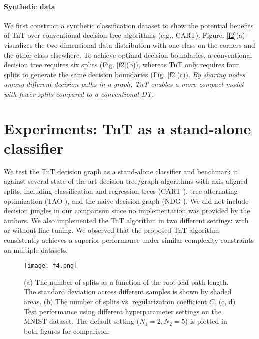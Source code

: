 \documentclass{article}
\begin{document}
\vspace{-2mm}
\paragraph{Synthetic data} We first construct a synthetic classification dataset to show the potential benefits of TnT over conventional decision tree algorithms (e.g., CART). Figure. \ref{f2}(a) visualizes the two-dimensional data distribution with one class on the corners and the other class elsewhere. To achieve optimal decision boundaries, a conventional decision tree requires six splits (Fig. \ref{f2}(b)), whereas TnT only requires four splits to generate the same decision boundaries (Fig. \ref{f2}(c)). \textit{By sharing nodes among different decision paths in a graph, TnT enables a more compact model with fewer splits compared to a conventional DT.}

\vspace{-0mm}
\section{Experiments: TnT as a stand-alone classifier}\vspace{-0mm}
We test the TnT decision graph as a stand-alone classifier and benchmark it against several state-of-the-art decision tree/graph algorithms with axis-aligned splits, including classification and regression trees (CART \cite{steinberg2009cart}), tree alternating optimization (TAO \cite{carreira2018alternating}), and the naive decision graph (NDG \cite{oliver1992decision}). 
We did not include  decision jungles \cite{shotton2013decision} in our comparison since no implementation was provided by the authors. We also implemented the TnT algorithm in two different settings: with or without fine-tuning. We observed that the proposed TnT algorithm consistently achieves a superior performance under similar complexity constraints on multiple datasets.


\begin{figure}[h]
  \centering
  \texttt{[image: f4.png]}
  \caption{(a) The number of splits as a function of the root-leaf path length. The standard deviation across different samples is shown by shaded areas. (b) The number of splits vs. regularization coefficient $C$. (c, d) Test performance using different hyperparameter settings on the MNIST dataset. The default setting ($N_1=2, N_2=5$) is plotted in both figures for comparison.}
  \label{f3}
\end{figure}
\end{document}
